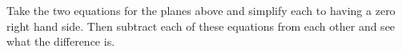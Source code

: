                                         \begin{exercise}
                                        Take the two equations for the planes above and simplify each to having a zero right hand side.  Then subtract each of these equations from each other and see what the difference is.
                                        \end{exercise}
                